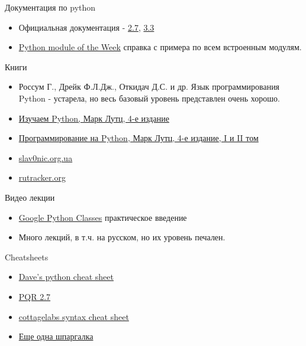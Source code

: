 \documentclass{article}
\begin{document}
\LARGE

\begin{center} Документация по python \end{center}
\begin{itemize}
	\item Официальная документация - \href{http://docs.python.org/2.7/}{2.7}, 
			\href{http://docs.python.org/3.3/}{3.3}
	\item \href{http://www.doughellmann.com/PyMOTW/}{Python module of the Week} 
		  справка с примера по всем встроенным модулям.
\end{itemize}

\begin{center} Книги \end{center}
\begin{itemize}
	\item Россум Г., Дрейк Ф.Л.Дж., Откидач Д.С. и др. Язык программирования Python 
	    - устарела, но весь базовый уровень представлен очень хорошо.
	\item \href{http://rutracker.org/forum/viewtopic.php?t=4130425}{Изучаем Python, Марк Лутц, 4-е издание}
	\item \href{http://rutracker.org/forum/viewtopic.php?t=3958297}{Программирование на Python, Марк Лутц, 4-е издание, I и II том}
    \item \href{http://slav0nic.org.ua/static/books/python/}{slav0nic.org.ua}
    \item \href{http://rutracker.org/forum/viewtopic.php?t=2436308}{rutracker.org}
\end{itemize}

\begin{center} Видео лекции \end{center}
\begin{itemize}
	\item \href{http://www.youtube.com/results?search_query=Google+Python+Class}{Google Python Classes} 
	      практическое введение
	\item Много лекций, в т.ч. на русском, но их уровень печален.
\end{itemize}

\begin{center} Cheatsheets \end{center}
\begin{itemize}
	\item \href{http://www.addedbytes.com/cheat-sheets/python-cheat-sheet/}{Dave's python cheat sheet} 
	\item \href{http://rgruet.free.fr/PQR27/PQR2.7_printing_a4.pdf}{PQR 2.7} 
	\item \href{http://cottagelabs.com/news/python-language-syntax-cheat-sheet}{cottagelabs syntax cheat sheet}
	\item \href{http://cheatography.com/sschaub/cheat-sheets/essential-python/}{Еще одна шпаргалка}
\end{itemize}
\end{document}

